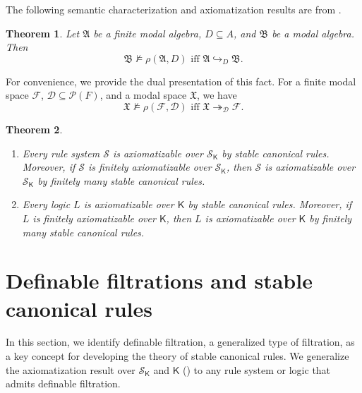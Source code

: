 \documentclass[a4paper,11pt]{article}
\newtheorem{theorem}{Theorem}
\theoremstyle{definition}
\theoremstyle{remark}
\numberwithin{theorem}{section}
\newcommand{\alg}[1]{\mathfrak{#1}}
\newcommand{\A}{\alg{A}}
\newcommand{\B}{\alg{B}}
\renewcommand{\sp}[1]{\mathfrak{#1}}
\newcommand{\X}{\sp{X}}
\newcommand{\fr}[1]{\mathcal{#1}}
\newcommand{\F}{\fr{F}}
\newcommand{\class}[1]{\mathcal{#1}}
\newcommand{\D}{\class{D}}
\renewcommand{\S}{\class{S}}
\newcommand{\pow}[1]{\mathcal{P} (#1)}
\newcommand{\logic}[1]{\mathsf{#1}}
\newcommand{\K}{\logic{K}}
\newcommand{\inj}{\hookrightarrow}
\newcommand{\surj}{\twoheadrightarrow}
\renewcommand{\S}{\mathcal{S}}
\begin{document}
The following semantic characterization and axiomatization results are from \cite{stablecanonicalrules}.

\begin{theorem} \label{3: Thm sc rule char}
    Let $\A$ be a finite modal algebra, $D \subseteq A$, and $\B$ be a modal algebra. Then 
    \[\B \not\models \rho(\A, D) \text{ iff } \A \inj_D \B.\]
\end{theorem}

For convenience, we provide the dual presentation of this fact. For a finite modal space $\F$, $\D \subseteq \pow{F}$, and a modal space $\X$, we have 
\[\X \not\models \rho(\F, \D) \text{ iff } \X \surj_\D \F.\]


\begin{theorem} \label{3: Thm scr ax over K} \leavevmode
    \begin{enumerate}
        \item Every rule system $\S$ is axiomatizable over $\S_\K$ by stable canonical rules. Moreover, if $\S$ is finitely axiomatizable over $\S_\K$, then $\S$ is axiomatizable over $\S_\K$ by finitely many stable canonical rules.
        \item Every logic $L$ is axiomatizable over $\K$ by stable canonical rules. Moreover, if $L$ is finitely axiomatizable over $\K$, then $L$ is axiomatizable over $\K$ by finitely many stable canonical rules.
    \end{enumerate}    
\end{theorem}

\section{Definable filtrations and stable canonical rules} \label{Sec 3}

In this section, we identify definable filtration, a generalized type of filtration, as a key concept for developing the theory of stable canonical rules. We generalize the axiomatization result over $\S_\K$ and $\K$ (\cite{stablecanonicalrules}) to any rule system or logic that admits definable filtration. 
\end{document}
